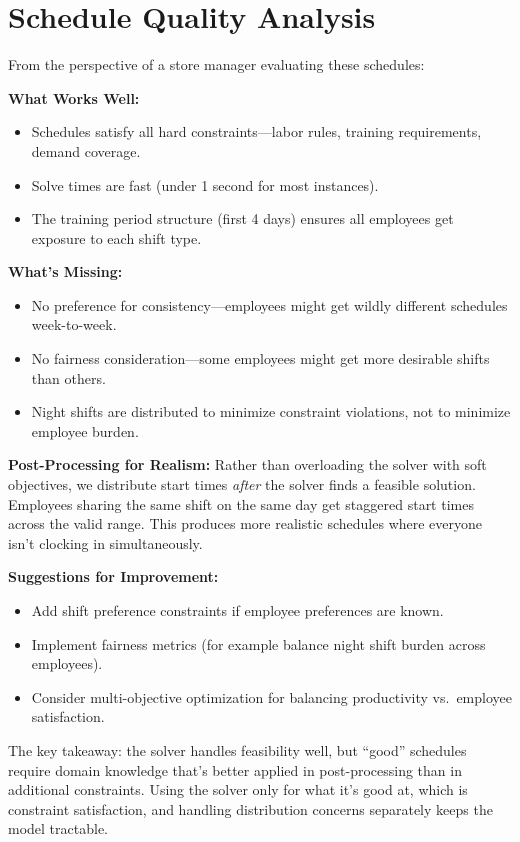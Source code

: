 \documentclass[11pt]{article}
\begin{document}
\section*{Schedule Quality Analysis}

From the perspective of a store manager evaluating these schedules:

\textbf{What Works Well:}
\begin{itemize}
	\item Schedules satisfy all hard constraints---labor rules, training requirements, demand coverage.
	\item Solve times are fast (under 1 second for most instances).
	\item The training period structure (first 4 days) ensures all employees get exposure to each shift type.
\end{itemize}

\textbf{What's Missing:}
\begin{itemize}
	\item No preference for consistency---employees might get wildly different schedules week-to-week.
	\item No fairness consideration---some employees might get more desirable shifts than others.
	\item Night shifts are distributed to minimize constraint violations, not to minimize employee burden.
\end{itemize}

\textbf{Post-Processing for Realism:} Rather than overloading the solver with soft objectives, we distribute start times \textit{after} the solver finds a feasible solution. Employees sharing the same shift on the same day get staggered start times across the valid range. This produces more realistic schedules where everyone isn't clocking in simultaneously.

\textbf{Suggestions for Improvement:}
\begin{itemize}
	\item Add shift preference constraints if employee preferences are known.
	\item Implement fairness metrics (for example balance night shift burden across employees).
	\item Consider multi-objective optimization for balancing productivity vs.\ employee satisfaction.
\end{itemize}

The key takeaway: the solver handles feasibility well, but ``good'' schedules require domain knowledge that's better applied in post-processing than in additional constraints. Using the solver only for what it's good at, which is constraint satisfaction, and handling distribution concerns separately keeps the model tractable.
\end{document}
